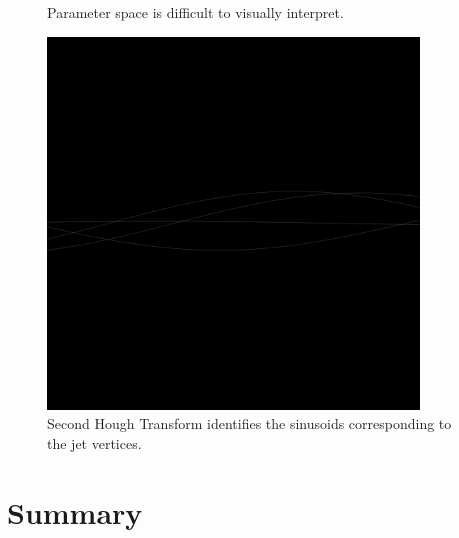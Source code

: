 \documentclass{JINST}
\begin{document}
\begin{figure}[!Hhtb]
\begin{minipage}[t]{4.9cm}
\begin{center}
	\caption{Parameter space is difficult to visually interpret.  \label{fig:jet2_accumulator}}
	\end{center}
\end{minipage}
\begin{minipage}[t]{4.9cm}
\begin{center}
	\includegraphics[width=0.88\textwidth]{figs/jet2/vertex.pdf}
	\caption{Second Hough Transform identifies the sinusoids corresponding to the jet vertices.  \label{fig:jet2_vertex}}
	\end{center}
\end{minipage}
\end{figure}

%
\section{Summary}
%
\end{document}
